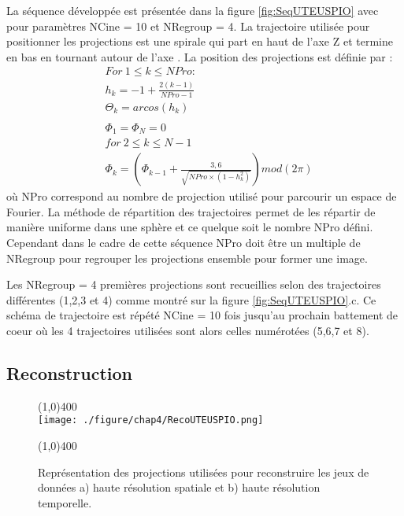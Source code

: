 La séquence développée est présentée dans la figure \ref{fig:SeqUTEUSPIO} avec pour paramètres NCine = 10 et NRegroup = 4. La trajectoire utilisée pour positionner les projections est une spirale qui part en haut de l'axe Z et termine en bas en tournant autour de l'axe \cite{Saff1997}. La position des projections est définie par :
\begin{equation}
\begin{split}
	& For \ 1 \leq k \leq NPro : \\ 
	& h_k = -1+\frac{2(k-1)}{NPro-1} \\
	& \Theta_k = arcos(h_k) \\
	& \\
	& \Phi_1=\Phi_N=0 \\	
	& for \ 2 \leq k \leq N-1 \\
	& \Phi_k=\left( \Phi_{k-1}+\frac{3,6}{\sqrt{NPro\times (1-h_k^2)}} \right)mod(2 \pi)	
\end{split}
\end{equation}
où NPro correspond au nombre de projection utilisé pour parcourir un espace de Fourier. La méthode de répartition des trajectoires permet de les répartir de manière uniforme dans une sphère et ce quelque soit le nombre NPro défini. Cependant dans le cadre de cette séquence NPro doit être un multiple de NRegroup pour regrouper les projections ensemble pour former une image.

Les NRegroup = 4 premières projections sont recueillies selon des trajectoires différentes (1,2,3 et 4) comme montré sur la figure \ref{fig:SeqUTEUSPIO}.c. Ce schéma de trajectoire est répété NCine = 10 fois jusqu'au prochain battement de coeur où les 4 trajectoires utilisées sont alors celles numérotées (5,6,7 et 8).

\subsection{Reconstruction}

\begin{figure}[H]
\centering
\line(1,0){400} \\
\texttt{[image: ./figure/chap4/RecoUTEUSPIO.png]}
\caption[Reconstruction séquence UTE USPIO]{\label{fig:RecoUTEUSPIO} Représentation des projections utilisées pour reconstruire les jeux de données a) haute résolution spatiale et b) haute résolution temporelle.}
\line(1,0){400} \\ 
\end{figure}

